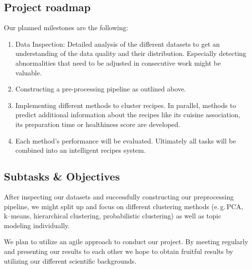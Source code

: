\documentclass[
     12pt,         %
     a4paper,      %
     BCOR10mm,     %
     DIV14,        %
     ]{article}
\begin{document}
\subsection{Project roadmap}

Our planned milestones are the following:

\begin{enumerate}
  \item Data Inspection: Detailed analysis of the different datasets to get an understanding of the data quality and their distribution. Especially detecting abnormalities that need to be adjusted in consecutive work might be valuable.
  \item Constructing a pre-processing pipeline as outlined above.
  \item Implementing different methods to cluster recipes. In parallel, methods to predict additional information about the recipes like its cuisine association, its preparation time or healthiness score are developed.
  \item Each method's performance will be evaluated. Ultimately all tasks will be combined into an intelligent recipes system.
\end{enumerate}

\subsection{Subtasks \& Objectives}
After inspecting our datasets and successfully constructing our preprocessing pipeline, we might split up and focus on different clustering methods (e.\,g.\,PCA, k--means, hierarchical clustering, probabilistic clustering) as well as topic modeling individually.

We plan to utilize an agile approach to conduct our project. By meeting regularly and presenting our results to each other we hope to obtain fruitful results by utilizing our different scientific backgrounds.



%
%
%


\newpage


\end{document}
